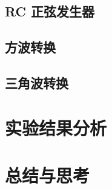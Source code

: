 \documentclass[lang=cn,11pt,a4paper,cite=authoryear]{elegantpaper}
\begin{document}
\subsection{RC 正弦发生器}

\subsection{方波转换}

\subsection{三角波转换}

\section{实验结果分析}

\section{总结与思考}


\end{document}
